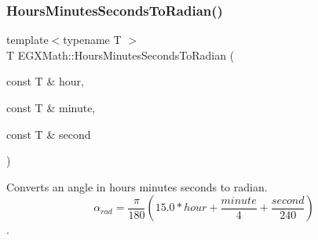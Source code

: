 \mbox{\label{group___e_g_x_math-_angle_conversions-_hours_minutes_seconds_gaa0b04e9012ec739df1464298971e3be7}} 
\subsubsection{\texorpdfstring{Hours\+Minutes\+Seconds\+To\+Radian()}{HoursMinutesSecondsToRadian()}}
{\footnotesize\ttfamily template$<$typename T $>$ \\
T E\+G\+X\+Math\+::\+Hours\+Minutes\+Seconds\+To\+Radian (\begin{DoxyParamCaption}\item[{const T \&}]{hour,  }\item[{const T \&}]{minute,  }\item[{const T \&}]{second }\end{DoxyParamCaption})}



Converts an angle in hours minutes seconds to radian. \[\alpha_{rad}=\frac{\pi}{180}(15.0 * hour + \frac{minute}{4} + \frac{second}{240})\]. 

